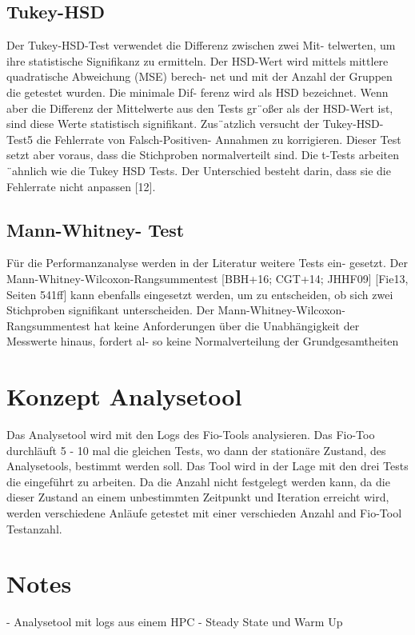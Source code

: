 \subsection{Tukey-HSD}
Der Tukey-HSD-Test verwendet die Differenz zwischen zwei Mit-
telwerten, um ihre statistische Signifikanz zu ermitteln.
Der HSD-Wert wird mittels mittlere quadratische Abweichung (MSE) berech-
net und mit der Anzahl der Gruppen die getestet wurden. Die minimale Dif-
ferenz wird als HSD bezeichnet. Wenn aber die Differenz der Mittelwerte aus
den Tests gr¨oßer als der HSD-Wert ist, sind diese Werte statistisch signifikant.
Zus¨atzlich versucht der Tukey-HSD-Test5 die Fehlerrate von Falsch-Positiven-
Annahmen zu korrigieren. Dieser Test setzt aber voraus, dass die Stichproben
normalverteilt sind. Die t-Tests arbeiten ¨ahnlich wie die Tukey HSD Tests. Der
Unterschied besteht darin, dass sie die Fehlerrate nicht anpassen [12]. 
\subsection{Mann-Whitney-
Test}
Für die Performanzanalyse werden in der Literatur weitere Tests ein-
gesetzt. Der Mann-Whitney-Wilcoxon-Rangsummentest [BBH+16; CGT+14; JHHF09]
[Fie13, Seiten 541ff] kann ebenfalls eingesetzt werden, um zu entscheiden, ob sich zwei
Stichproben signifikant unterscheiden. Der Mann-Whitney-Wilcoxon-Rangsummentest
hat keine Anforderungen über die Unabhängigkeit der Messwerte hinaus, fordert al-
so keine Normalverteilung der Grundgesamtheiten

\section{Konzept Analysetool}
Das Analysetool wird mit den Logs des Fio-Tools analysieren.
Das Fio-Too durchläuft 5 - 10 mal die gleichen Tests, wo dann der stationäre Zustand, des Analysetools,
bestimmt werden soll. Das Tool wird in der Lage mit den drei Tests die eingeführt zu arbeiten.
Da die Anzahl nicht festgelegt werden kann, da die dieser Zustand an einem unbestimmten Zeitpunkt und Iteration erreicht wird,
werden verschiedene Anläufe getestet mit einer verschieden Anzahl and Fio-Tool Testanzahl.

\section{Notes}

- Analysetool mit logs aus einem HPC
- Steady State und Warm Up

